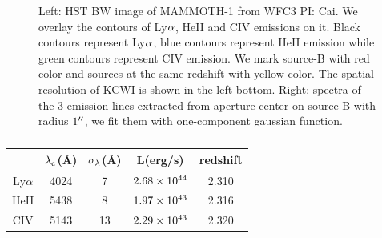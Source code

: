 \documentclass[../Results.tex]{subfiles}
\begin{document}
\begin{figure}
		\centering
		\label{overlayspec}
		\caption{Left: HST BW image of MAMMOTH-1 from WFC3 PI: Cai. We overlay the contours of Ly$\rm \alpha$, HeII and CIV emissions on it. Black contours represent Ly$\rm \alpha$, blue contours represent HeII emission while green contours represent CIV emission. We mark source-B with red color and sources at the same redshift with yellow color. The spatial resolution of KCWI is shown in the left bottom. Right: spectra of the 3 emission lines extracted from aperture center on source-B with radius $\rm 1\mbox{$^{\prime\prime}$}$, we fit them with one-component gaussian function.}
\end{figure}
	\begin{table}[htp]
	\begin{center}
		\begin{tabular}{ccccc}
\hline
\hline
& $\rm \lambda_{c}$(\AA) & $\rm \sigma_{\lambda}$(\AA) & L(erg/s) & redshift \\ \hline
Ly$\alpha$ &   4024  &     7  &   $\rm 2.68 \times 10^{44}$ & 2.310        \\
HeII       &   5438  &     8  &   $\rm 1.97 \times 10^{43}$ & 2.316        \\
CIV        &   5143  &     13 &   $\rm 2.29 \times 10^{43}$ & 2.320        \\ \hline
\end{tabular}
\end{center}
	\caption{}
	\label{fit_L}
	\end{table}
\end{document}
